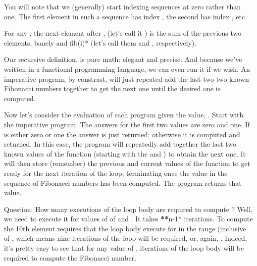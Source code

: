 \documentclass[letterpaper,10pt,english]{sphinxmanual}
\begin{document}
You will note that we (generally) start indexing sequences at zero
rather than one. The first element in such a sequence has index ,
the second has index , etc.

For any , the next element after ,  (let’s call
it ) is the sum of the previous two elements, banely 
and fib(i)* (let’s call them  and , respectively).

Our recursive definition,  is pure math: elegant and precise.
And because we’ve written in a functional programming language, we can
even run it if we wish. An imperative program, by constrast, will just
repeated add the last two two known Fibonacci numbers together to get
the next one until the desired  one is computed.

Now let’s consider the evaluation of each program given the value, . Start with the imperative program. The answers for the first two
values are zero and one. If  is either zero or one the answer is
just returned; otherwise it is computed and returned. In this case,
the program will repeatedly add together the last two known values of
the function (starting with the  and ) to obtain the next one.
It will then store (remember) the previous and current values of the
function to get ready for the next iteration of the loop, terminating
once the  value in the sequence of Fibonacci numbers has been
computed. The program returns that value.

Question: How many executions of the loop body are required to compute
? Well, we need to execute it for values of  of 
and . It takes  {\color{red}\bfseries{}**}n-1* iterations. To compute the 10th element
requires that the loop body execute for  in the range (inclusive
of \sphinxstyleemphasis{{[}2, 3, …, 10{]}}, which means nine iterations of the loop will be
required, or, again, . Indeed, it’s pretty easy to see that for
any value of ,  iterations of the loop body will be required
to compute the  Fibonacci number.
\end{document}
